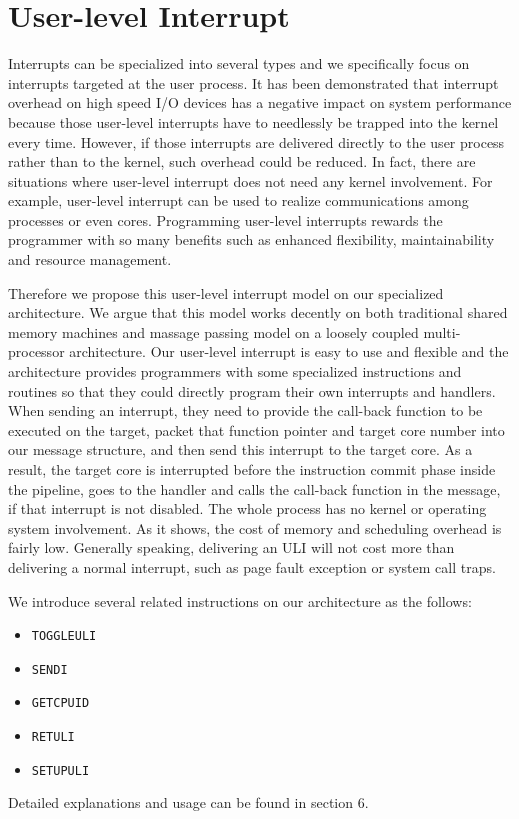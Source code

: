 \section{User-level Interrupt}
Interrupts can be specialized into several types and we specifically focus on interrupts targeted at the user process. It has been demonstrated that interrupt overhead on high speed I/O devices has a negative impact on system performance because those user-level interrupts have to needlessly be trapped into the kernel every time. However, if those interrupts are delivered directly to the user process rather than to the kernel, such overhead could be reduced. In fact, there are situations where user-level interrupt does not need any kernel involvement. For example, user-level interrupt can be used to realize communications among processes or even cores. Programming user-level interrupts rewards the programmer with so many benefits such as enhanced flexibility, maintainability and resource management.

Therefore we propose this user-level interrupt model on our specialized architecture. We argue that this model works decently on both traditional shared memory machines and massage passing model on a loosely coupled multi-processor architecture. Our user-level interrupt is easy to use and flexible and the architecture provides programmers with some specialized instructions and routines so that they could directly program their own interrupts and handlers. When sending an interrupt, they need to provide the call-back function to be executed on the target, packet that function pointer and target core number into our message structure, and then send this interrupt to the target core. As a result, the target core is interrupted before the instruction commit phase inside the pipeline, goes to the handler and calls the call-back function in the message, if that interrupt is not disabled. The whole process has no kernel or operating system involvement. As it shows, the cost of memory and scheduling overhead is fairly low. Generally speaking, delivering an ULI will not cost more than delivering a normal interrupt, such as page fault exception or system call traps. 

We introduce several related instructions on our architecture as the follows:
\begin{itemize}
\item \texttt{TOGGLEULI}
\item \texttt{SENDI}
\item \texttt{GETCPUID}
\item \texttt{RETULI}
\item \texttt{SETUPULI}
\end{itemize}
Detailed explanations and usage can be found in section 6.

